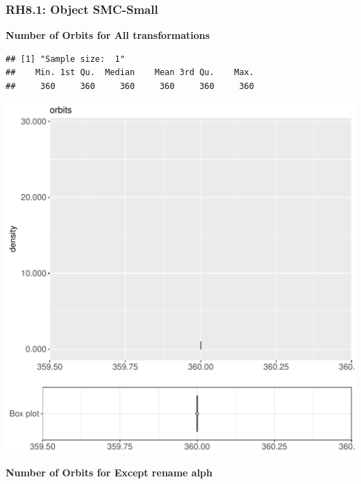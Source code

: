 \documentclass{article}\usepackage[]{graphicx}\usepackage[]{color}
\makeatletter
\def\maxwidth{ %
  \ifdim\Gin@nat@width>\linewidth
    \linewidth
  \else
    \Gin@nat@width
  \fi
}
\newenvironment{kframe}{%
 \def\at@end@of@kframe{}%
 \ifinner\ifhmode%
  \def\at@end@of@kframe{\end{minipage}}%
  \begin{minipage}{\columnwidth}%
 \fi\fi%
 \def\FrameCommand##1{\hskip\@totalleftmargin \hskip-\fboxsep
 \colorbox{shadecolor}{##1}\hskip-\fboxsep
     \hskip-\linewidth \hskip-\@totalleftmargin \hskip\columnwidth}%
 \MakeFramed {\advance\hsize-\width
   \@totalleftmargin\z@ \linewidth\hsize
   \@setminipage}}%
 {\par\unskip\endMakeFramed%
 \at@end@of@kframe}
\newenvironment{knitrout}{}{} %
\makeatother
\begin{document}
\subsubsection{RH8.1: Object SMC-Small}

 \textbf{Number of Orbits for All transformations}
\begin{knitrout}
\color{fgcolor}\begin{kframe}
\begin{verbatim}
## [1] "Sample size:  1"
##    Min. 1st Qu.  Median    Mean 3rd Qu.    Max. 
##     360     360     360     360     360     360
\end{verbatim}


{\ttfamily\noindent\bfseries{}}\end{kframe}
\includegraphics[width=\maxwidth]{figure/RH8_cashew_small-1} 

\end{knitrout}
 \textbf{Number of Orbits for Except rename alph}
\end{document}
